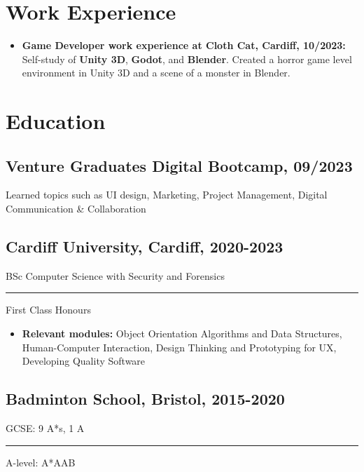 \documentclass[11pt]{article}
\newcommand{\verticalline}[1][1pt]{\rule[-0.35ex]{#1}{0.9em}}
\begin{document}
    \section{Work Experience}
    \begin{itemize}[itemsep=0pt, leftmargin=1em]
         \item \textbf{Game Developer work experience at Cloth Cat, Cardiff, 10/2023:} Self-study of \textbf{Unity 3D}, \textbf{Godot}, and \textbf{Blender}. Created a horror game level environment in Unity 3D and a scene of a monster in Blender.
    \end{itemize}

    \section{Education}
    \subsection{Venture Graduates Digital Bootcamp, 09/2023}Learned topics such as UI design, Marketing, Project Management, Digital Communication \& Collaboration 
    \subsection{Cardiff University, Cardiff, 2020-2023} 
    BSc Computer Science with Security and Forensics  \verticalline{} First Class Honours
    \begin{itemize}[itemsep=0pt, leftmargin=1em, topsep=-\parskip]
        \item \textbf{Relevant modules:} Object Orientation Algorithms and Data Structures, Human-Computer Interaction, Design Thinking and Prototyping for UX, Developing Quality Software
    \end{itemize}
    \subsection{Badminton School, Bristol, 2015-2020}
    GCSE: 9 A*s, 1 A \verticalline{} A-level: A*AAB
\end{document}
